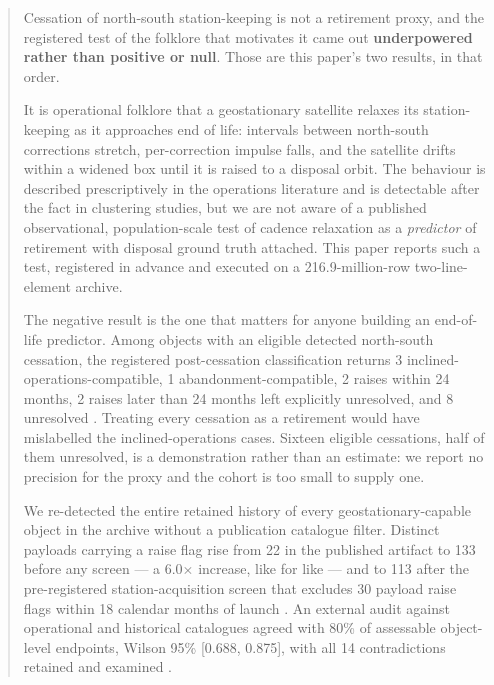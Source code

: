 \documentclass[11pt]{article}
\begin{document}
\begin{abstract}

Cessation of north-south station-keeping is not a retirement proxy, and the registered test of the folklore that motivates it came out \textbf{underpowered rather than positive or null}. Those are this paper's two results, in that order.

It is operational folklore that a geostationary satellite relaxes its station-keeping as it approaches end of life: intervals between north-south corrections stretch, per-correction impulse falls, and the satellite drifts within a widened box until it is raised to a disposal orbit. The behaviour is described prescriptively in the operations literature and is detectable after the fact in clustering studies, but we are not aware of a published observational, population-scale test of cadence relaxation as a \emph{predictor} of retirement with disposal ground truth attached. This paper reports such a test, registered in advance and executed on a 216.9-million-row two-line-element archive.

The negative result is the one that matters for anyone building an end-of-life predictor. Among objects with an eligible detected north-south cessation, the registered post-cessation classification returns 3 inclined-operations-compatible, 1 abandonment-compatible, 2 raises within 24 months, 2 raises later than 24 months left explicitly unresolved, and 8 unresolved%
. Treating every cessation as a retirement would have mislabelled the inclined-operations cases. Sixteen eligible cessations, half of them unresolved, is a demonstration rather than an estimate: we report no precision for the proxy and the cohort is too small to supply one.

We re-detected the entire retained history of every geostationary-capable object in the archive without a publication catalogue filter. Distinct payloads carrying a raise flag rise from 22 in the published artifact to 133 before any screen --- a 6.0$\times$ increase, like for like --- and to 113 after the pre-registered station-acquisition screen that excludes 30 payload raise flags within 18 calendar months of launch%
. An external audit against operational and historical catalogues agreed with 80\% of assessable object-level endpoints, Wilson 95\% [0.688, 0.875], with all 14 contradictions retained and examined%
.


\end{abstract}
\end{document}
